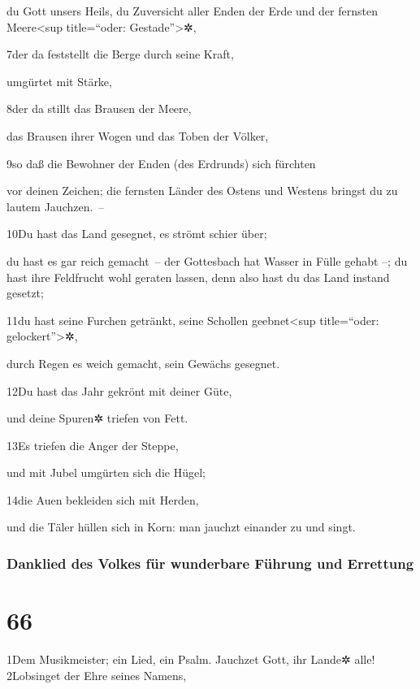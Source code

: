du Gott unsers Heils, du Zuversicht aller Enden der Erde und der
fernsten Meere\textless sup title=``oder: Gestade''\textgreater✲,

7der da feststellt die Berge durch seine Kraft,

umgürtet mit Stärke,

8der da stillt das Brausen der Meere,

das Brausen ihrer Wogen und das Toben der Völker,

9so daß die Bewohner der Enden (des Erdrunds) sich fürchten

vor deinen Zeichen; die fernsten Länder des Ostens und Westens bringst
du zu lautem Jauchzen.~--

10Du hast das Land gesegnet, es strömt schier über;

du hast es gar reich gemacht~-- der Gottesbach hat Wasser in Fülle
gehabt --; du hast ihre Feldfrucht wohl geraten lassen, denn also hast
du das Land instand gesetzt;

11du hast seine Furchen getränkt, seine Schollen geebnet\textless sup
title=``oder: gelockert''\textgreater✲,

durch Regen es weich gemacht, sein Gewächs gesegnet.

12Du hast das Jahr gekrönt mit deiner Güte,

und deine Spuren✲ triefen von Fett.

13Es triefen die Anger der Steppe,

und mit Jubel umgürten sich die Hügel;

14die Auen bekleiden sich mit Herden,

und die Täler hüllen sich in Korn: man jauchzt einander zu und singt.

\hypertarget{danklied-des-volkes-fuxfcr-wunderbare-fuxfchrung-und-errettung}{%
\subsubsection{Danklied des Volkes für wunderbare Führung und
Errettung}\label{danklied-des-volkes-fuxfcr-wunderbare-fuxfchrung-und-errettung}}

\hypertarget{section-65}{%
\section{66}\label{section-65}}

1Dem Musikmeister; ein Lied, ein Psalm. Jauchzet Gott, ihr Lande✲ alle!
2Lobsinget der Ehre seines Namens,

